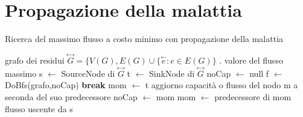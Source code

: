 \documentclass{article}
\begin{document}
\section{Propagazione della malattia}
\begin{algorithm}
\caption{Ricerca del massimo flusso a costo minimo con propagazione della malattia}
\begin{algorithmic}
\REQUIRE grafo dei residui $\overset{\leftrightarrow}{G} = \{V(G),E(G) \cup \{ \overset{\leftarrow}{e} : e \in E(G) \}$ .
\ENSURE valore del flusso massimo
\STATE s $\leftarrow$ SourceNode di $\overset{\leftrightarrow}{G}$
\STATE t $\leftarrow$ SinkNode di $\overset{\leftrightarrow}{G}$
\STATE noCap $\leftarrow$ null
\LOOP
\STATE f $\leftarrow$ DoBfs(grafo,noCap)
\STATE \textbf{break}
\ENDIF
\STATE mom $\leftarrow$ t
\STATE aggiorno capacità o flusso del nodo m a seconda del suo predecessore
\STATE noCap $\leftarrow$ mom
\ENDIF
\STATE mom $\leftarrow$ predecessore di mom
\ENDWHILE
\ENDLOOP
\RETURN flusso uscente da s
\end{algorithmic}
\end{algorithm}
\end{document}
